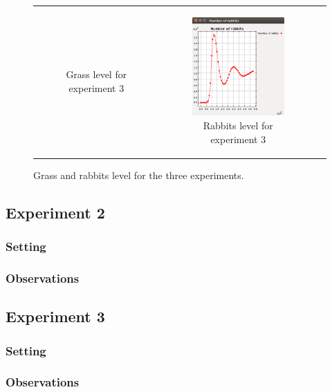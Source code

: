 \documentclass[11pt]{article}
\begin{document}
\begin{figure}
\begin{tabular}{c c c}
\begin{subfigure}[b]{0.3\textwidth}
        \caption{\label{img:grass3} Grass level for experiment 3}
    \end{subfigure} &
    \begin{subfigure}[b]{0.3\textwidth}
        \includegraphics[width=\textwidth]{experiment/3/Rabbits.png}
        \caption{\label{img:rabbits3} Rabbits level for experiment 3}
    \end{subfigure}
   
    \end{tabular}
  \caption{Grass and rabbits level for the three experiments.}
\end{figure}

\subsection{Experiment 2}

\subsubsection{Setting}

\subsubsection{Observations}

\subsection{Experiment 3}
\label{sec:experiment3}

\subsubsection{Setting}

\subsubsection{Observations}
\end{document}
